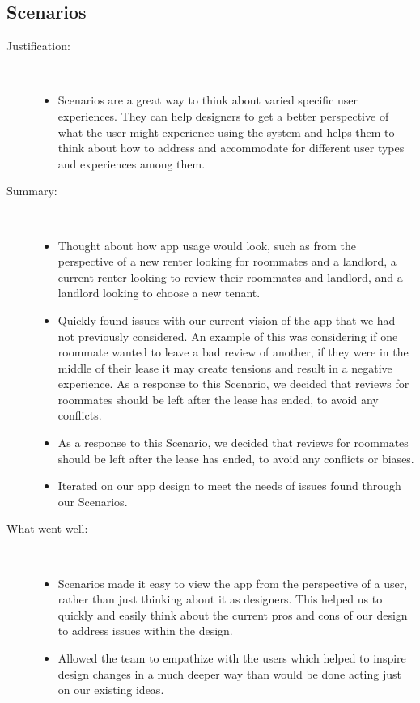 \documentclass{article}
\begin{document}
\subsection{Scenarios}
\begin{description}
    \item[Justification:]
    \newline \,
    \begin{itemize}
        \item  Scenarios are a great way to think about varied specific user experiences. They can 
        help designers to get a better perspective of what the user might experience using the 
        system and helps them to think about how to address and accommodate for different user types 
        and experiences among them.
    \end{itemize}
    
    \item[Summary:]
    \newline \,
    \begin{itemize}
        \item Thought about how app usage would look, such as from the perspective of a new renter 
        looking for roommates and a landlord, a current renter looking to review their roommates and 
        landlord, and a landlord looking to choose a new tenant.
        \item Quickly found issues with our current vision of the app that we had not previously 
        considered. An example of this was considering if one roommate wanted to leave a bad review 
        of another, if they were in the middle of their lease it may create tensions and result in a 
        negative experience. As a response to this Scenario, we decided that reviews for roommates 
        should be left after the lease has ended, to avoid any conflicts.
        \item As a response to this Scenario, we decided that reviews for roommates should be left 
        after the lease has ended, to avoid any conflicts or biases.
        \item Iterated on our app design to meet the needs of issues found through our Scenarios.
    \end{itemize}
    
    \item[What went well:]
    \newline \,
    \begin{itemize}
        \item Scenarios made it easy to view the app from the perspective of a user, rather than just 
        thinking about it as designers. This helped us to quickly and easily think about the current 
        pros and cons of our design to address issues within the design.
        \item Allowed the team to empathize with the users which helped to inspire design changes in 
        a much deeper way than would be done acting just on our existing ideas.
    \end{itemize}
    

\end{description}
\end{document}
